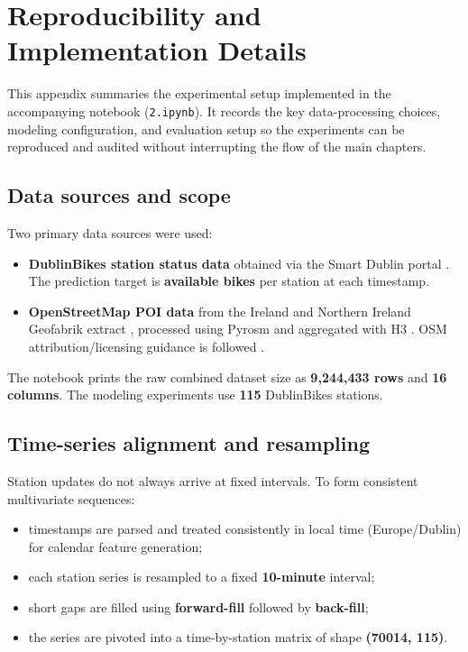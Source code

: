 \documentclass[11pt]{report}
\begin{document}

\appendix
\cleardoublepage


\chapter{Reproducibility and Implementation Details}
\label{app:repro}

This appendix summaries the experimental setup implemented in the accompanying notebook (\texttt{2.ipynb}). It records the key data-processing choices, modeling configuration, and evaluation setup so the experiments can be reproduced and audited without interrupting the flow of the main chapters.

\section{Data sources and scope}
Two primary data sources were used:
\begin{itemize}
    \item \textbf{DublinBikes station status data} obtained via the Smart Dublin portal \cite{smartdublin_dublinbikes_api,smartdublin_dublinbikes_api_resource}. The prediction target is \textbf{available bikes} per station at each timestamp.
    \item \textbf{OpenStreetMap POI data} from the Ireland and Northern Ireland Geofabrik extract \cite{geofabrik_ireland}, processed using Pyrosm \cite{pyrosm_docs} and aggregated with H3 \cite{h3_docs}. OSM attribution/licensing guidance is followed \cite{osm_copyright,osm_attribution}.
\end{itemize}

The notebook prints the raw combined dataset size as \textbf{9,244,433 rows} and \textbf{16 columns}. The modeling experiments use \textbf{115} DublinBikes stations.

\section{Time-series alignment and resampling}
Station updates do not always arrive at fixed intervals. To form consistent multivariate sequences:
\begin{itemize}
    \item timestamps are parsed and treated consistently in local time (Europe/Dublin) for calendar feature generation;
    \item each station series is resampled to a fixed \textbf{10-minute} interval;
    \item short gaps are filled using \textbf{forward-fill} followed by \textbf{back-fill};
    \item the series are pivoted into a time-by-station matrix of shape \textbf{(70014, 115)}.
\end{itemize}
\end{document}

